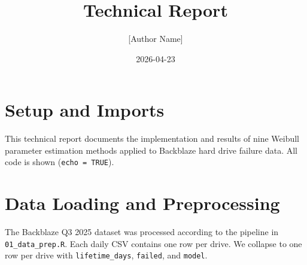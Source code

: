 \documentclass[
]{article}
\title{Technical Report}
\author{{[}Author Name{]}}
\date{2026-04-23}
\newenvironment{Shaded}{\begin{snugshade}}{\end{snugshade}}
\newcommand{\AttributeTok}[1]{\textcolor[rgb]{0.13,0.29,0.53}{#1}}
\newcommand{\ConstantTok}[1]{\textcolor[rgb]{0.56,0.35,0.01}{#1}}
\newcommand{\FunctionTok}[1]{\textcolor[rgb]{0.13,0.29,0.53}{\textbf{#1}}}
\newcommand{\NormalTok}[1]{#1}
\newcommand{\OtherTok}[1]{\textcolor[rgb]{0.56,0.35,0.01}{#1}}
\newcommand{\SpecialCharTok}[1]{\textcolor[rgb]{0.81,0.36,0.00}{\textbf{#1}}}
\newcommand{\StringTok}[1]{\textcolor[rgb]{0.31,0.60,0.02}{#1}}
\begin{document}
\maketitle

{
\setcounter{tocdepth}{3}
\tableofcontents
}
\section{Setup and Imports}\label{setup-and-imports}

This technical report documents the implementation and results of nine
Weibull parameter estimation methods applied to Backblaze hard drive
failure data. All code is shown (\texttt{echo\ =\ TRUE}).

\begin{Shaded}
\end{Shaded}

\section{Data Loading and
Preprocessing}\label{data-loading-and-preprocessing}

The Backblaze Q3 2025 dataset was processed according to the pipeline in
\texttt{01\_data\_prep.R}. Each daily CSV contains one row per drive. We
collapse to one row per drive with \texttt{lifetime\_days},
\texttt{failed}, and \texttt{model}.
\end{document}

